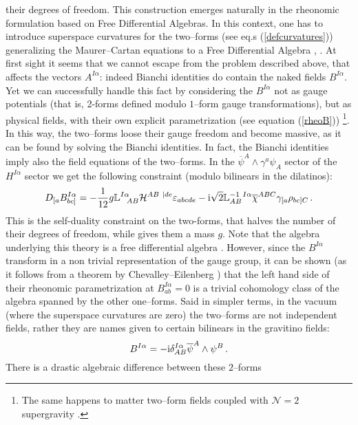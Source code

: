 \documentclass[a4paper,12pt]{article}
\def\bar{\overline}\end {picture}}
\begin{document}
their degrees of freedom. This construction emerges naturally in
the rheonomic formulation based on Free Differential Algebras. In
this context, one has to introduce superspace curvatures for the
two--forms (see eq.s (\ref{defcurvatures})) generalizing the
Maurer--Cartan equations to a Free Differential Algebra
\cite{castdauriafre}, \cite{Fre:1984pc}. At first sight it seems
that we cannot escape from the problem described above, that
affects the vectors $A^{I\alpha}$:  indeed Bianchi identities do
contain the naked fields $B^{I\alpha}$. Yet we can successfully
handle this fact by considering the $B^{I\alpha}$ not as gauge
potentials (that is, 2-forms defined modulo $1$--form gauge
transformations), but as physical fields, with their own explicit
parametrization (see equation (\ref{rheoB})) \footnote{The same
happens to matter two--form fields coupled with $\mathcal{N}=2$
supergravity \cite{Ceresole:2000jd}.}. In this way, the two--forms
loose their gauge freedom and become massive, as it can be found
by solving the Bianchi identities. In fact, the Bianchi identities
imply also  the field equations of the two--forms. In the
 $\bar{\psi}^A\wedge\gamma^a\psi_A$ sector of the $H^{I\alpha}$ sector we get the
 following constraint (modulo bilinears in the dilatinos):
\begin{equation}
\label{eqmotB} D_{[a}B^{I\alpha}_{bc]}= -{1\over 12} g
\mathbb{L}^{I\alpha}_{~~AB}\mathcal{H}^{AB~|de}\varepsilon_{abcde}
-{\rm
i}\sqrt{2}\mathbb{L}^{-1~I\alpha}_{AB}\bar{\chi}^{ABC}\gamma_{[a}\rho
_{bc]C}\,.
\end{equation}
This is the self-duality constraint on the two-forms, that halves
the number of  their degrees of freedom, while gives them a mass
$g$. Note that the algebra underlying this theory is a free
differential algebra \cite{sull,castdauriafre,Fre:1984pc}.
However, since the $B^{I\alpha}$ transform in a non trivial
representation of the gauge group, it can be shown (as it follows
from a theorem by Chevalley--Eilenberg \cite{sull}) that the left
hand side of their rheonomic parametrization at
$B^{I\alpha}_{ab}=0$ is  a trivial cohomology class of the algebra
spanned by the other one--forms. Said in simpler terms, in the
vacuum (where the superspace curvatures are zero) the two--forms
are not independent fields, rather they are names given to certain
bilinears in the gravitino fields:
\begin{equation}
B^{I\alpha}=-{\rm
i}\delta^{I\alpha}_{AB}\bar{\psi}^A\wedge\psi^B\,.
\end{equation}
There is a drastic algebraic difference between these $2$--forms
\end{document}
